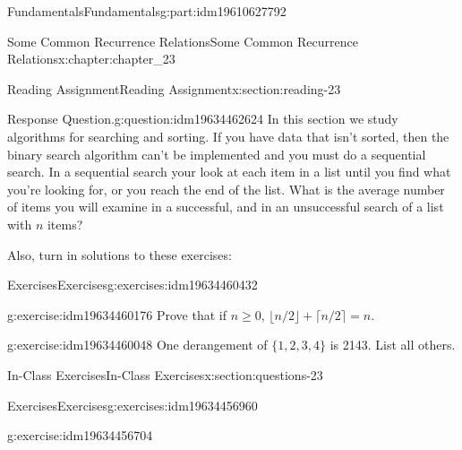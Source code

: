 \documentclass[oneside,10pt,]{book}
\numberwithin{equation}{section}
\begin{document}
\begin{partptx}{Fundamentals}{}{Fundamentals}{}{}{g:part:idm19610627792}
\begin{chapterptx}{Some Common Recurrence Relations}{}{Some Common Recurrence Relations}{}{}{x:chapter:chapter_23}
\begin{sectionptx}{Reading Assignment}{}{Reading Assignment}{}{}{x:section:reading-23}
\begin{question}{Response Question.}{g:question:idm19634462624}
In this section we study algorithms for searching and sorting.  If you have data that isn't sorted, then the binary search algorithm can't be implemented and you must do a sequential search. In a sequential search your look at each item in a list until you find what you're looking for, or you reach the end of the list.  What is the average number of items you will examine in a successful, and in an unsuccessful search of a list with \(n\) items?%
\end{question}
Also, turn in solutions to these exercises:%
%
%
\typeout{************************************************}
\typeout{************************************************}
%
\begin{exercises-subsection-numberless}{Exercises}{}{Exercises}{}{}{g:exercises:idm19634460432}
\par\medskip\noindent%
%
\begin{exercisegroup}
\begin{divisionexerciseeg}{1}{}{}{g:exercise:idm19634460176}%
Prove that if \(n \geq 0\), \(\lfloor n/2\rfloor +\lceil n/2\rceil = n\).%
\end{divisionexerciseeg}%
\begin{divisionexerciseeg}{2}{}{}{g:exercise:idm19634460048}%
One derangement of \(\{1,2,3,4\}\) is 2143.  List all others.%
\end{divisionexerciseeg}%
\end{exercisegroup}
\par\medskip\noindent
\end{exercises-subsection-numberless}
\end{sectionptx}
%
%
\typeout{************************************************}
\typeout{************************************************}
%
\begin{sectionptx}{In-Class Exercises}{}{In-Class Exercises}{}{}{x:section:questions-23}
%
%
%
\typeout{************************************************}
\typeout{************************************************}
%
\begin{exercises-subsection-numberless}{Exercises}{}{Exercises}{}{}{g:exercises:idm19634456960}
\par\medskip\noindent%
%
\begin{exercisegroup}
\begin{divisionexerciseeg}{1}{}{}{g:exercise:idm19634456704}%

\end{divisionexerciseeg}
\end{exercisegroup}
\end{exercises-subsection-numberless}
\end{sectionptx}
\end{chapterptx}
\end{partptx}
\end{document}
